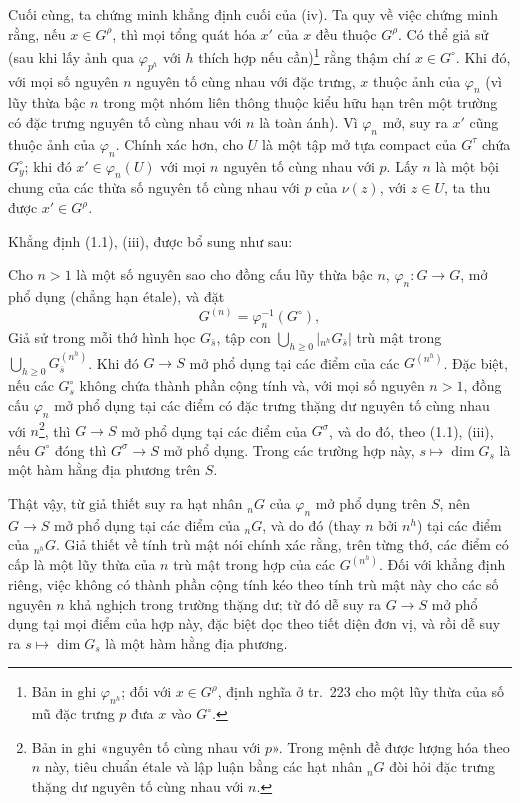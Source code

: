 Cuối cùng, ta chứng minh khẳng định cuối của (iv). Ta quy về việc chứng minh
rằng, nếu $x\in G^\rho$, thì mọi tổng quát hóa $x'$ của $x$ đều thuộc
$G^\rho$. Có thể giả sử (sau khi lấy ảnh qua $\varphi_{p^h}$ với $h$ thích
hợp nếu cần)\footnote{Bản in ghi $\varphi_{n^h}$; đối với $x\in G^\rho$, định
nghĩa ở tr.~223 cho một lũy thừa của số mũ đặc trưng $p$ đưa $x$ vào
$G^\circ$.} rằng thậm chí $x\in G^\circ$. Khi đó, với mọi số nguyên $n$
nguyên tố cùng nhau với đặc trưng, $x$ thuộc ảnh của $\varphi_n$ (vì lũy thừa
bậc $n$ trong một nhóm liên thông thuộc kiểu hữu hạn trên một trường có đặc
trưng nguyên tố cùng nhau với $n$ là toàn ánh). Vì $\varphi_n$ mở, suy ra $x'$
cũng thuộc ảnh của $\varphi_n$. Chính xác hơn, cho $U$ là một tập mở tựa
compact của $G^\tau$ chứa $G_y^\circ$; khi đó
$x'\in\varphi_n(U)$ với mọi $n$ nguyên tố cùng nhau với $p$. Lấy $n$ là một
bội chung của các thừa số nguyên tố cùng nhau với $p$ của $\nu(z)$, với
$z\in U$, ta thu được $x'\in G^\rho$.

Khẳng định (1.1), (iii), được bổ sung như sau:

 Cho $n>1$ là một số nguyên sao cho đồng cấu lũy thừa bậc
$n$, $\varphi_n:G\longrightarrow G$, mở phổ dụng (chẳng hạn étale), và đặt
\[
G^{(n)}=\varphi_n^{-1}(G^\circ),
\]
Giả sử trong mỗi thớ hình học $G_{\bar s}$, tập con
$\bigcup_{h\geq0}|{}_{n^h}G_{\bar s}|$ trù mật trong
$\bigcup_{h\geq0}G_{\bar s}^{(n^h)}$. Khi đó
$G\longrightarrow S$ mở phổ dụng tại các điểm của các $G^{(n^h)}$. Đặc biệt,
nếu các $G_s^\circ$ không chứa thành phần cộng tính và, với mọi số nguyên
$n>1$, đồng cấu $\varphi_n$ mở phổ dụng tại các điểm có đặc trưng thặng dư
nguyên tố cùng nhau với $n$\footnote{Bản in ghi «nguyên tố cùng nhau với
$p$». Trong mệnh đề được lượng hóa theo $n$ này, tiêu chuẩn étale và lập luận
bằng các hạt nhân ${}_nG$ đòi hỏi đặc trưng thặng dư nguyên tố cùng nhau với
$n$.}, thì $G\longrightarrow S$ mở phổ dụng tại các điểm của $G^\sigma$, và
do đó, theo (1.1), (iii), nếu $G^\circ$ đóng thì
$G^\sigma\longrightarrow S$ mở phổ dụng. Trong các trường hợp này,
$s\longmapsto\dim G_s$ là một hàm hằng địa phương trên $S$.

Thật vậy, từ giả thiết suy ra hạt nhân ${}_nG$ của $\varphi_n$ mở phổ dụng
trên $S$, nên $G\longrightarrow S$ mở phổ dụng tại các điểm của ${}_nG$, và
do đó (thay $n$ bởi $n^h$) tại các điểm của ${}_{n^h}G$. Giả thiết về tính trù mật nói chính xác rằng, trên từng thớ, các điểm có cấp
là một lũy thừa của $n$ trù mật trong hợp của các $G^{(n^h)}$. Đối với khẳng
định riêng, việc không có thành phần cộng tính kéo theo tính trù mật này cho
các số nguyên $n$ khả nghịch trong trường thặng dư; từ đó dễ suy
ra $G\longrightarrow S$ mở phổ dụng tại mọi điểm của hợp này, đặc biệt dọc
theo tiết diện đơn vị, và rồi dễ suy ra $s\longmapsto\dim G_s$ là một hàm
hằng địa phương.

